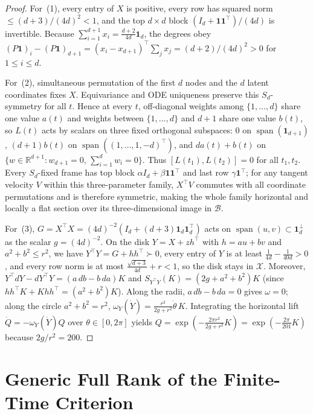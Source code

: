 \documentclass[11pt]{article}
\theoremstyle{plain}
\theoremstyle{definition}
\theoremstyle{remark}
\DeclareMathOperator{\spn}{span}
\begin{document}
\begin{proof}
For~(1), every entry of $X$ is positive, every row has squared norm $\le (d+3)/(4d)^2 < 1$, and the top $d \times d$ block $(I_d + \mathbf{1}\mathbf{1}^\top)/(4d)$ is invertible.
Because $\sum_{i=1}^{d+1} x_i = \frac{d+2}{4d}\mathbf{1}_d$, the degrees obey $(P\mathbf{1})_i - (P\mathbf{1})_{d+1} = (x_i - x_{d+1})^\top \sum_j x_j = (d+2)/(4d)^2 > 0$ for $1 \le i \le d$.

For~(2), simultaneous permutation of the first $d$ nodes and the $d$ latent coordinates fixes $X$.
Equivariance and ODE uniqueness preserve this $S_d$-symmetry for all $t$.
Hence at every $t$, off-diagonal weights among $\{1,\dots,d\}$ share one value $a(t)$ and weights between $\{1,\dots,d\}$ and $d+1$ share one value $b(t)$, so $L(t)$ acts by scalars on three fixed orthogonal subspaces: $0$ on $\spn(\mathbf{1}_{d+1})$, $(d+1)b(t)$ on $\spn((1,\dots,1,-d)^\top)$, and $da(t)+b(t)$ on $\{w \in \mathbb{R}^{d+1} : w_{d+1} = 0,\, \sum_{i=1}^d w_i = 0\}$.
Thus $[L(t_1), L(t_2)] = 0$ for all $t_1, t_2$.
Every $S_d$-fixed frame has top block $\alpha I_d + \beta \mathbf{1}\mathbf{1}^\top$ and last row $\gamma \mathbf{1}^\top$; for any tangent velocity $V$ within this three-parameter family, $X^\top V$ commutes with all coordinate permutations and is therefore symmetric, making the whole family horizontal and locally a flat section over its three-dimensional image in $\mathcal{B}$.

For~(3), $G = X^\top X = (4d)^{-2}(I_d + (d+3)\mathbf{1}_d\mathbf{1}_d^\top)$ acts on $\spn(u, v) \subset \mathbf{1}_d^\perp$ as the scalar $g = (4d)^{-2}$.
On the disk $Y = X + zh^\top$ with $h = au + bv$ and $a^2 + b^2 \le r^2$, we have $Y^\top Y = G + hh^\top \succ 0$, every entry of $Y$ is at least $\frac{1}{4d} - \frac{1}{40d} > 0$, and every row norm is at most $\frac{\sqrt{d+3}}{4d} + r < 1$, so the disk stays in $\mathcal{X}$.
Moreover, $Y^\top dY - dY^\top Y = (a\,db - b\,da)K$ and $S_{Y^\top Y}(K) = (2g + a^2 + b^2)K$ (since $hh^\top K + Khh^\top = (a^2+b^2)K$).
Along the radii, $a\,db - b\,da = 0$ gives $\omega = 0$; along the circle $a^2 + b^2 = r^2$, $\omega_Y(\dot{Y}) = \frac{r^2}{2g + r^2}\dot{\theta}\,K$.
Integrating the horizontal lift $\dot{Q} = -\omega_Y(\dot{Y})Q$ over $\theta \in [0, 2\pi]$ yields $Q = \exp(-\frac{2\pi r^2}{2g + r^2}K) = \exp(-\frac{2\pi}{201}K)$ because $2g/r^2 = 200$.
\end{proof}

\section{Generic Full Rank of the Finite-Time Criterion}
\end{document}

